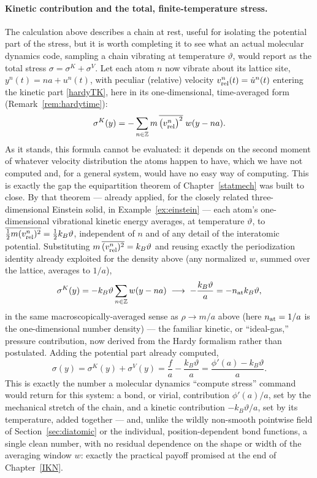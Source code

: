 \paragraph{Kinetic contribution and the total, finite-temperature stress.} The calculation above describes a chain at rest, useful for isolating the potential part of the stress, but it is worth completing it to see what an actual molecular dynamics code, sampling a chain vibrating at temperature $\vartheta$, would report as the total stress $\sigma=\sigma^K+\sigma^V$. Let each atom $n$ now vibrate about its lattice site, $y^n(t)=na+u^n(t)$, with peculiar (relative) velocity $v^n_{\rm rel}(t)=\dot u^n(t)$ entering the kinetic part \eqref{hardyTK}, here in its one-dimensional, time-averaged form (Remark~\ref{rem:hardytime}):
\begin{equation}
	\sigma^K(y) = -\sum_{n\in\mathbb Z} m\,\overline{\big(v^n_{\rm rel}\big)^2}\;w(y-na).
\end{equation}
As it stands, this formula cannot be evaluated: it depends on the second moment of whatever velocity distribution the atoms happen to have, which we have not computed and, for a general system, would have no easy way of computing. This is exactly the gap the equipartition theorem of Chapter~\ref{statmech} was built to close. By that theorem --- already applied, for the closely related three-dimensional Einstein solid, in Example~\ref{ex:einstein} --- each atom's one-dimensional vibrational kinetic energy averages, at temperature $\vartheta$, to $\overline{\tfrac12m(v^n_{\rm rel})^2}=\tfrac12k_B\vartheta$, independent of $n$ and of any detail of the interatomic potential. Substituting $m\,\overline{(v^n_{\rm rel})^2}=k_B\vartheta$ and reusing exactly the periodization identity already exploited for the density above (any normalized $w$, summed over the lattice, averages to $1/a$),
\begin{equation}\label{sigmaK1D}
	\sigma^K(y) = -k_B\vartheta\sum_{n\in\mathbb Z}w(y-na) \;\longrightarrow\; -\frac{k_B\vartheta}{a} = -n_{\rm at}k_B\vartheta,
\end{equation}
in the same macroscopically-averaged sense as $\rho\to m/a$ above (here $n_{\rm at}=1/a$ is the one-dimensional number density) --- the familiar kinetic, or ``ideal-gas,'' pressure contribution, now derived from the Hardy formalism rather than postulated. Adding the potential part already computed,
\begin{equation}\label{totalchainstress}
	\boxed{\;\sigma(y) = \sigma^K(y)+\sigma^V(y) = \frac{f}{a} - \frac{k_B\vartheta}{a} = \frac{\phi'(a)-k_B\vartheta}{a}.\;}
\end{equation}
This is exactly the number a molecular dynamics ``compute stress'' command would return for this system: a bond, or virial, contribution $\phi'(a)/a$, set by the mechanical stretch of the chain, and a kinetic contribution $-k_B\vartheta/a$, set by its temperature, added together --- and, unlike the wildly non-smooth pointwise field of Section~\ref{sec:diatomic} or the individual, position-dependent bond functions, a single clean number, with no residual dependence on the shape or width of the averaging window $w$: exactly the practical payoff promised at the end of Chapter~\ref{IKN}.

